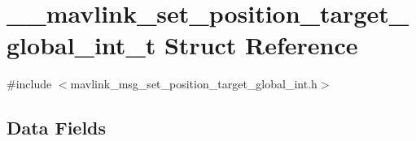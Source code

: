 \hypertarget{struct____mavlink__set__position__target__global__int__t}{\section{\+\_\+\+\_\+mavlink\+\_\+set\+\_\+position\+\_\+target\+\_\+global\+\_\+int\+\_\+t Struct Reference}
\label{struct____mavlink__set__position__target__global__int__t}
}


{\ttfamily \#include $<$mavlink\+\_\+msg\+\_\+set\+\_\+position\+\_\+target\+\_\+global\+\_\+int.\+h$>$}

\subsection*{Data Fields}
